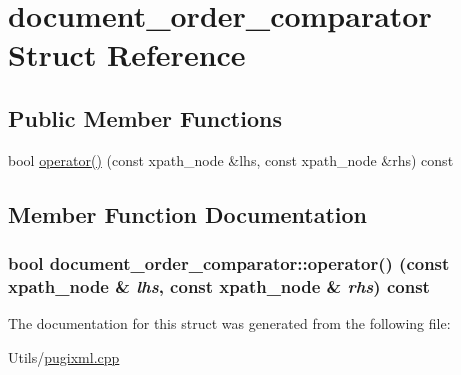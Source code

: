 \hypertarget{structdocument__order__comparator}{
\section{document\_\-order\_\-comparator Struct Reference}
\label{structdocument__order__comparator}
}
\subsection*{Public Member Functions}
\begin{CompactItemize}
\item 
bool \hyperlink{structdocument__order__comparator_11e471cbfa426bc9e48844c1db1a190e}{operator()} (const xpath\_\-node \&lhs, const xpath\_\-node \&rhs) const 
\end{CompactItemize}


\subsection{Member Function Documentation}
\hypertarget{structdocument__order__comparator_11e471cbfa426bc9e48844c1db1a190e}{
\subsubsection[operator()]{\setlength{\rightskip}{0pt plus 5cm}bool document\_\-order\_\-comparator::operator() (const xpath\_\-node \& {\em lhs}, const xpath\_\-node \& {\em rhs}) const}}
\label{structdocument__order__comparator_11e471cbfa426bc9e48844c1db1a190e}




The documentation for this struct was generated from the following file:\begin{CompactItemize}
\item 
Utils/\hyperlink{pugixml_8cpp}{pugixml.cpp}\end{CompactItemize}
